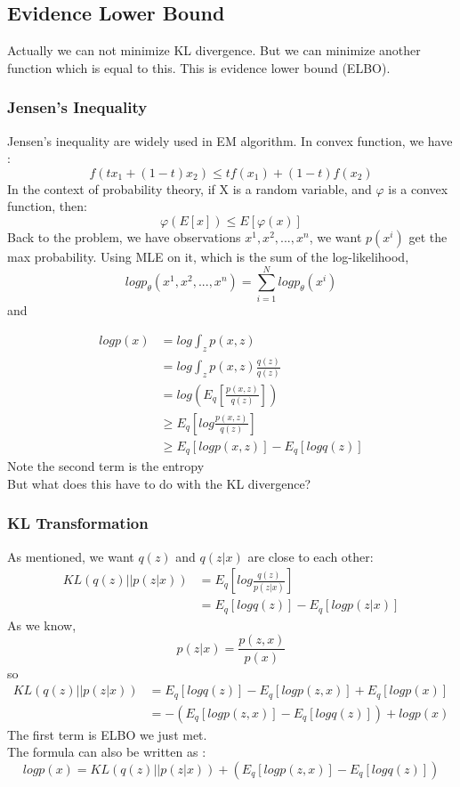 \documentclass{article}
\begin{document}
\subsection{Evidence Lower Bound}
Actually we can not minimize KL divergence. But we can minimize another function which is equal to this. This is evidence lower bound (ELBO).
\subsubsection{Jensen's Inequality}
Jensen's inequality are widely used in EM algorithm. In convex function, we have :
$$f(tx_{1}+(1-t)x_{2})\leq tf(x_{1})+(1-t)f(x_{2}) $$ 
In the context of probability theory, if X is a random variable, and $\varphi$ is a convex function, then:
$$\varphi(E[x]) \leq E[\varphi(x)]$$
Back to the problem, we have observations $x^{1},x^{2},...,x^{n}$, we want $p(x^{i})$ get the max probability. Using MLE on it, which is the sum of the log-likelihood,
$$logp_{\theta}(x^{1},x^{2},...,x^{n})=\sum_{i=1}^{N}logp_{\theta} (x^{i})$$
and

\begin{align*}
logp(x) & =log \int_{z}p(x,z) \\
 &= log \int_{z}p(x,z)\frac{q(z)}{q(z)} \\
 &= log \left( E_{q} \left[ \frac{p(x,z)}{q(z)} \right] \right) \\
 &\geq E_{q} \left[ log \frac{p(x,z)}{q(z)} \right] \\
 &\geq E_{q}[logp(x,z)]-E_{q}[logq(z)]
\end{align*}
Note the second term is the entropy\\
But what does this have to do with the KL divergence? 
\subsubsection{KL Transformation}
As mentioned, we want $q(z)$ and $q(z|x)$ are close to each other:
\begin{align*}
KL(q(z)||p(z|x)) &= E_{q}\left[ log \frac{q(z)}{p(z|x)} \right] \\
&=E_{q}[logq(z)]-E_{q}[logp(z|x)]
\end{align*}
As we know,
$$p(z|x)=\frac{p(z,x)}{p(x)}$$
so 
\begin{align*}
KL(q(z)||p(z|x)) &= E_{q}[logq(z)]-E_{q}[logp(z,x)]+E_{q}[logp(x)] \\
&= -(E_{q}[logp(z,x)]-E_{q}[logq(z)])+logp(x)
\end{align*}
The first term is ELBO we just met.\\
The formula can also be written as :
$$logp(x)=KL(q(z)||p(z|x))+(E_{q}[logp(z,x)]-E_{q}[logq(z)])$$
\end{document}
